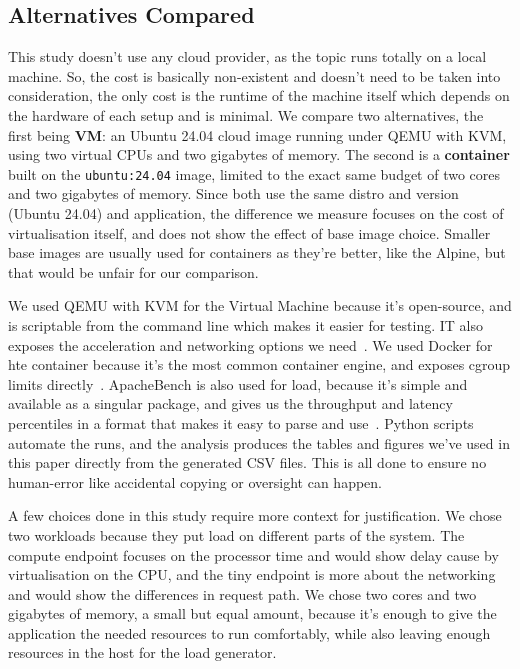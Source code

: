 \documentclass[conference,a4paper]{IEEEtran}
\begin{document}
\subsection{Alternatives Compared}
This study doesn’t use any cloud provider, as the topic runs totally on a local machine. So, the cost is basically non-existent and doesn’t need to be taken into consideration, the only cost is the runtime of the machine itself which depends on the hardware of each setup and is minimal. We compare two alternatives, the first being \textbf{VM}: an Ubuntu 24.04 cloud image running under QEMU with KVM, using two virtual CPUs and two gigabytes of memory. The second is a \textbf{container} built on the \texttt{ubuntu:24.04} image, limited to the exact same budget of two cores and two gigabytes of memory. Since both use the same distro and version (Ubuntu 24.04) and application, the difference we measure focuses on the cost of virtualisation itself, and does not show the effect of base image choice. Smaller base images are usually used for containers as they’re better, like the Alpine, but that would be unfair for our comparison.

We used QEMU with KVM for the Virtual Machine because it’s open-source, and is scriptable from the command line which makes it easier for testing. IT also exposes the acceleration and networking options we need~\cite{b5}. We used Docker for hte container because it’s the most common container engine, and exposes cgroup limits directly~\cite{b4}. ApacheBench is also used for load, because it’s simple and available as a singular package, and gives us the throughput and latency percentiles in a format that makes it easy to parse and use~\cite{b6}. Python scripts automate the runs, and the analysis produces the tables and figures we’ve used in this paper directly from the generated CSV files. This is all done to ensure no human-error like accidental copying or oversight can happen.

A few choices done in this study require more context for justification. We chose two workloads because they put load on different parts of the system. The compute endpoint focuses on the processor time and would show delay cause by virtualisation on the CPU, and the tiny endpoint is more about the networking and would show the differences in request path. We chose two cores and two gigabytes of memory, a small but equal amount, because it’s enough to give the application the needed resources to run comfortably, while also leaving enough resources in the host for the load generator.
\end{document}
